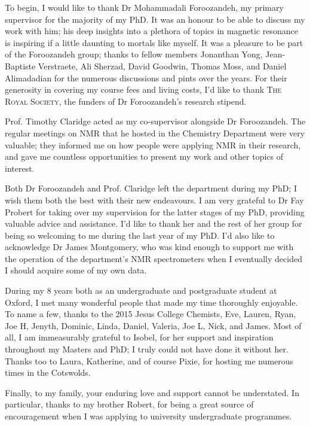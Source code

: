 \begin{acknowledgements}
    To begin, I would like to thank Dr Mohammadali Foroozandeh, my primary
    supervisor for the majority of my PhD. It was an honour to be able to
    discuss my work with him; his deep insights into a plethora of
    topics in magnetic resonance is inspiring if a little daunting to
    mortals like myself.
    It was a pleasure to be part of the Foroozandeh group; thanks to fellow
    members Jonanthan Yong, Jean-Baptiste Verstraete, Ali Sherzad, David
    Goodwin, Thomas Moss, and Daniel Alimadadian for the numerous discussions
    and pints over the years.
    For their generosity in covering my course fees and living costs, I'd like
    to thank \textsc{The Royal Society}, the funders of Dr Foroozandeh's research
    stipend.

    Prof. Timothy Claridge acted as my co-supervisor alongside Dr Foroozandeh.
    The regular meetings on NMR that he hosted in the Chemistry Department were
    very valuable; they informed me on how people were applying NMR in their
    research, and gave me countless opportunities to present my work and other
    topics of interest.

    Both Dr Foroozandeh and Prof. Claridge left the department during my PhD;
    I wish them both the best with their new endeavours.
    I am very grateful to Dr Fay Probert for taking over my supervision for the
    latter stages of my PhD, providing valuable advice and assistance.
    I'd like to thank her and the rest of her group for being so welcoming to
    me during the last year of my PhD. I'd also like to acknowledge Dr James
    Montgomery, who was kind enough to support me with the
    operation of the department's NMR spectrometers when I eventually decided
    I should acquire some of my own data.

    During my 8 years both as an undergraduate and postgraduate student at
    Oxford, I met many wonderful people that made my time thoroughly enjoyable.
    To name a few, thanks to the 2015 Jesus College Chemists, Eve, Lauren,
    Ryan, Joe H, Jenyth, Dominic, Linda, Daniel, Valeria, Joe L, Nick,
    and James. Most of all, I am immeasurably grateful to Isobel, for her
    support and inspiration throughout my Masters and PhD; I truly could not
    have done it without her. Thanks too to Laura, Katherine, and of course
    Pixie, for hosting me numerous times in the Cotswolds.

    Finally, to my family, your enduring love and support cannot be
    understated. In particular, thanks to my brother Robert, for being a great
    source of encouragement when I was applying to university undergraduate
    programmes.
\end{acknowledgements}
